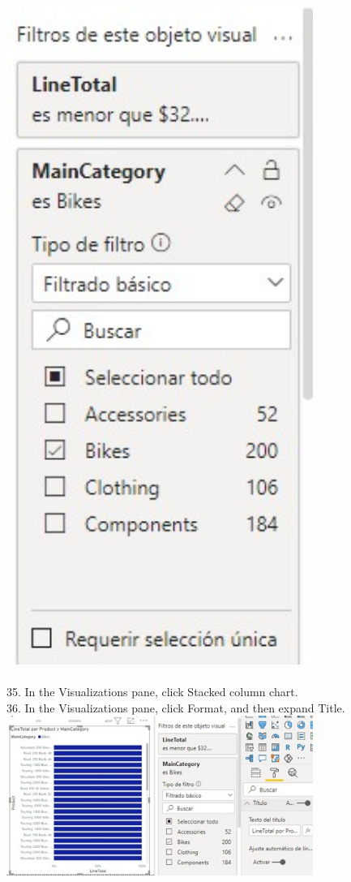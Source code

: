 \documentclass[preprint,12pt]{elsarticle}
\begin{document}
\begin{itemize}
				\\ \includegraphics[width=10cm]{./IMAGENES/4.34} \\
			\\ 35. In the Visualizations pane, click Stacked column chart.
			\\ 36. In the Visualizations pane, click Format, and then expand Title.
				\\ \includegraphics[width=10cm]{./IMAGENES/4.36} \\

\end{itemize}
\end{document}
